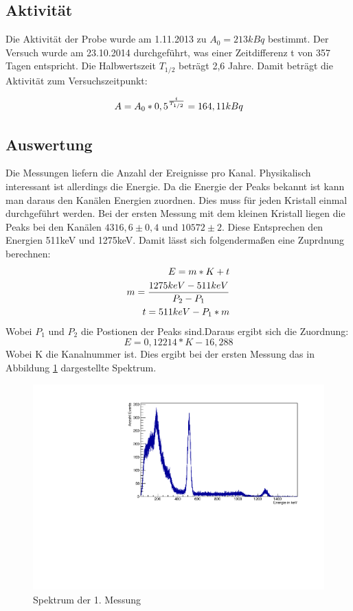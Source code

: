 \documentclass[a4paper,11pt,twoside]{article}
\begin{document}
\subsection{Aktivität}
Die Aktivität der Probe wurde am 1.11.2013 zu $A_0=213 kBq$ bestimmt. Der Versuch wurde am 23.10.2014 durchgeführt, was einer Zeitdifferenz t von 357 Tagen entspricht. Die Halbwertszeit $T_{1/2}$ beträgt 2,6 Jahre. Damit beträgt die Aktivität zum Versuchszeitpunkt:

\begin{equation}
A=A_0*0,5^{t\over T_{1/2}}=164,11 kBq
\end{equation}

\subsection{Auswertung}
Die Messungen liefern die Anzahl der Ereignisse pro Kanal. Physikalisch interessant ist allerdings die Energie. Da die Energie der Peaks bekannt ist kann man daraus den Kanälen Energien zuordnen. Dies muss für jeden Kristall einmal durchgeführt werden. Bei der ersten Messung mit dem kleinen Kristall liegen die Peaks bei den Kanälen $4316,6\pm0,4$ und $10572\pm2$. Diese Entsprechen den Energien 511keV und 1275keV. 
Damit lässt sich folgendermaßen eine Zuprdnung berechnen:
\begin{align}
E=m*K+t\\
m={{1275keV-511keV}\over{P_2-P_1}}\\
t=511keV-P_1*m
\end{align}
Wobei $P_1$ und $P_2$ die Postionen der Peaks sind.Daraus ergibt sich die Zuordnung:
\begin{equation}
E=0,12214*K-16,288
\end{equation}
Wobei K die Kanalnummer ist.
Dies ergibt bei der ersten Messung das in Abbildung \ref{l1} dargestellte Spektrum.
\begin{figure}[htbp]
	\begin{center}
		\includegraphics[width=\textwidth]{Messung11.pdf}
		\caption{Spektrum der 1. Messung}
		\label{l1}
	\end{center}
\end{figure}
\end{document}
